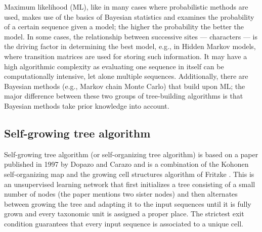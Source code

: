 \documentclass[11pt,twocolumn]{article}
\begin{document}
Maximum likelihood (ML), like in many cases where probabilistic methods are used, makes use of the basics of Bayesian statistics and examines the probability of a certain sequence given a model; the higher the probability the better the model. In some cases, the relationship between successive sites — characters — is the driving factor in determining the best model, e.g., in Hidden Markov models, where transition matrices are used for storing such information. It may have a high algorithmic complexity as evaluating one sequence in itself can be computationally intensive, let alone multiple sequences. Additionally, there are Bayesian methods (e.g., Markov chain Monte Carlo) that build upon ML; the major difference between these two groups of tree-building algorithms is that Bayesian methods take prior knowledge into account.

\subsection{Self-growing tree algorithm}

Self-growing tree algorithm (or self-organizing tree algorithm) is based on a paper published in 1997 by Dopazo and Carazo \cite{Dopazo1997} and is a combination of the Kohonen self-organizing map \cite{58325} and the growing cell structures algorithm of Fritzke \cite{Fritzke1994}. This is an unsupervised learning network that first initializes a tree consisting of a small number of nodes (the paper mentions two sister nodes) and then alternates between growing the tree and adapting it to the input sequences until it is fully grown and every taxonomic unit is assigned a proper place. The strictest exit condition guarantees that every input sequence is associated to a unique cell.
\end{document}
